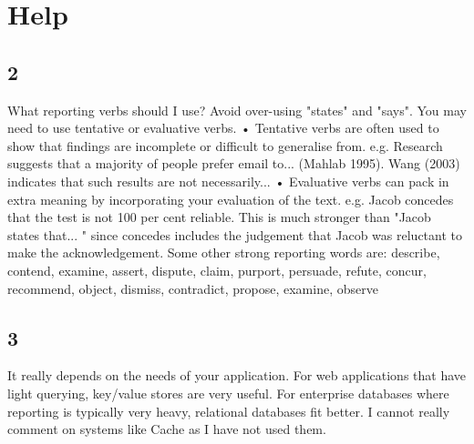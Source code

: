 \documentclass[12pt,letter]{article}
\begin{document}
\section*{Help}
\subsection*{2}
What reporting verbs should I use?
Avoid over-using "states" and "says". You may need to use tentative or evaluative verbs.
• Tentative verbs are often used to show that findings are incomplete or difficult to generalise from.
e.g. Research suggests that a majority of people prefer email to... (Mahlab 1995). Wang (2003) indicates that such results are not necessarily...
• Evaluative verbs can pack in extra meaning by incorporating your evaluation of the text. e.g. Jacob concedes that the test is not 100 per cent reliable.
This is much stronger than "Jacob states that... " since concedes includes the judgement that Jacob was reluctant to make the acknowledgement.
Some other strong reporting words are:
describe, contend, examine, assert, dispute, claim, purport, persuade, refute, concur, recommend, object, dismiss, contradict, propose, examine, observe

\subsection*{3}
It really depends on the needs of your application. For web applications that have light querying, key/value stores are very useful. For enterprise databases where reporting is typically very heavy, relational databases fit better. I cannot really comment on systems like Cache as I have not used them.


\end{document}

